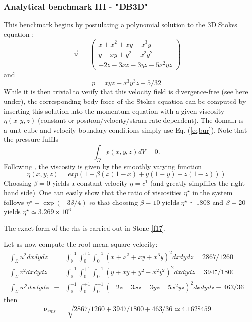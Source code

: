 \subsubsection{Analytical benchmark III \label{mms3} - "DB3D"}

This benchmark begins by postulating a polynomial solution 
to the 3D Stokes equation \cite{dobo04}:
\begin{equation}
\vec{\upnu}
=
\left(
\begin{array}{c}
x+x^2+xy+x^3y \\
y + xy + y^2 + x^2 y^2\\
-2z - 3xz - 3yz - 5x^2 yz
\end{array}
\right)
\label{eqbur}
\end{equation}
and
\begin{equation}
p = xyz + x^3 y^3z - 5/32
\end{equation}
While it is then trivial to verify that this velocity field is divergence-free (see here under),  
the corresponding body force of the Stokes equation can be computed by  
inserting this solution into the momentum equation with a given viscosity $\eta(x,y,z)$
(constant or position/velocity/strain rate dependent). 
The domain is a unit cube and velocity boundary conditions 
simply use Eq. (\ref{eqbur}). 
Note that the pressure fulfils 
\[
\int_\Omega p(x,y,z) dV = 0.  
\]
Following \cite{busa13}, the viscosity
is given by the smoothly varying function
\begin{equation}
\eta(x,y,z) = exp(1 - \beta(x(1 - x) + y(1 - y) + z(1 - z)))
\end{equation}
Choosing $\beta=0$ yields a constant velocity $\eta=e^1$ (and greatly simplifies the right-hand side).
One can easily show that the ratio of viscosities $\eta^\star$
in the system follows $\eta^\star=\exp(-3\beta/4)$ so that choosing $\beta=10$ yields
$\eta^\star\simeq 1808$ and $\beta=20$ yields $\eta^\star\simeq 3.269\times10^6$.

The exact form of the rhs is carried out in Stone \ref{f17}.

Let us now compute the root mean square velocity:
\begin{eqnarray}
\int_\Omega u^2 dx dy dz &=& \int_{0}^{+1}\int_{0}^{+1}\int_{0}^{+1} (x+x^2+xy+x^3y )^2 dx dy dz = 2867/1260 \\
\int_\Omega v^2 dx dy dz &=& \int_{0}^{+1}\int_{0}^{+1}\int_{0}^{+1} (y + xy + y^2 + x^2 y^2 )^2 dx dy dz = 3947/1800   \\
\int_\Omega w^2 dx dy dz &=& \int_{0}^{+1}\int_{0}^{+1}\int_{0}^{+1} (-2z - 3xz - 3yz - 5x^2 yz )^2 dx dy dz = 463/36   
\end{eqnarray}
then
\[
\upnu_{rms}=\sqrt{ 2867/1260 + 3947/1800 + 463/36  } \simeq 4.1628459
\]



